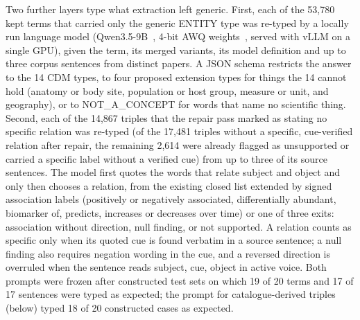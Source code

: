 \documentclass[referee,lineno,pdflatex,sn-vancouver-num]{sn-jnl}
\theoremstyle{thmstyleone}%
\theoremstyle{thmstyletwo}%
\theoremstyle{thmstylethree}%
\begin{document}
Two further layers type what extraction left generic. First, each of the
53,780 kept terms that carried only the generic ENTITY type was re-typed by
a locally run language model (Qwen3.5-9B~\cite{qwen35card}, 4-bit AWQ
weights~\cite{lin2023awq}, served with vLLM on a single GPU), given the
term, its merged variants, its model definition and up to three corpus
sentences from distinct papers. A JSON schema restricts the answer to the
14 CDM types, to four proposed extension types for things the 14 cannot
hold (anatomy or body site, population or host group, measure or unit, and
geography), or to NOT\_A\_CONCEPT for words that name no scientific thing.
Second, each of the 14,867 triples that the repair pass marked as stating
no specific relation was re-typed (of the 17,481 triples without a specific,
cue-verified relation after repair, the remaining 2,614 were already flagged
as unsupported or carried a specific label without a verified cue) from up to three of its source sentences. The
model first quotes the words that relate subject and object and only then
chooses a relation, from the existing closed list extended by signed
association labels (positively or negatively associated, differentially
abundant, biomarker of, predicts, increases or decreases over time) or one
of three exits: association without direction, null finding, or not
supported. A relation counts as specific only when its quoted cue is found
verbatim in a source sentence; a null finding also requires negation
wording in the cue, and a reversed direction is overruled when the
sentence reads subject, cue, object in active voice. Both prompts were
frozen after constructed test sets on which 19 of 20 terms and 17 of 17
sentences were typed as expected; the prompt for catalogue-derived triples
(below) typed 18 of 20 constructed cases as expected.
\end{document}
